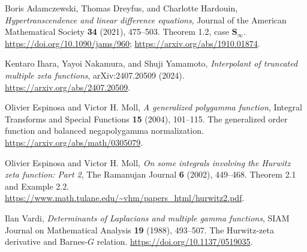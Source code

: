 Boris Adamczewski, Thomas Dreyfus, and Charlotte Hardouin,
\emph{Hypertranscendence and linear difference equations},
Journal of the American Mathematical Society \textbf{34} (2021),
475--503. Theorem 1.2, case $\mathbf S_\infty$.
\url{https://doi.org/10.1090/jams/960};
\url{https://arxiv.org/abs/1910.01874}.

Kentaro Ihara, Yayoi Nakamura, and Shuji Yamamoto,
\emph{Interpolant of truncated multiple zeta functions},
arXiv:2407.20509 (2024).
\url{https://arxiv.org/abs/2407.20509}.

Olivier Espinosa and Victor H. Moll,
\emph{A generalized polygamma function},
Integral Transforms and Special Functions \textbf{15} (2004),
101--115. The generalized order function and balanced
negapolygamma normalization.
\url{https://arxiv.org/abs/math/0305079}.

Olivier Espinosa and Victor H. Moll,
\emph{On some integrals involving the Hurwitz zeta function: Part 2},
The Ramanujan Journal \textbf{6} (2002), 449--468.
Theorem 2.1 and Example 2.2.
\url{https://www.math.tulane.edu/~vhm/papers_html/hurwitz2.pdf}.

Ilan Vardi,
\emph{Determinants of Laplacians and multiple gamma functions},
SIAM Journal on Mathematical Analysis \textbf{19} (1988),
493--507. The Hurwitz-zeta derivative and Barnes-$G$ relation.
\url{https://doi.org/10.1137/0519035}.
